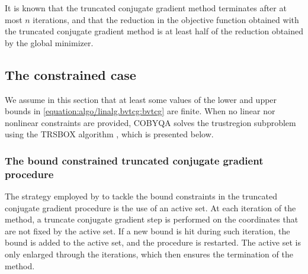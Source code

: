 \documentclass[letterpaper,10pt,english]{sphinxmanual}
\begin{document}
\sphinxAtStartPar
It is known that the truncated conjugate gradient method terminates after at
most \(n\) iterations, and that the reduction in the objective function
obtained with the truncated conjugate gradient method is at least half of the
reduction obtained by the global minimizer.


\subsection{The constrained case}
\label{\detokenize{algo/linalg.bvtcg:the-constrained-case}}
\sphinxAtStartPar
We assume in this section that at least some values of the lower and upper
bounds in \eqref{equation:algo/linalg.bvtcg:bvtcg} are finite. When no linear nor nonlinear constraints are
provided, COBYQA solves the trust\sphinxhyphen{}region subproblem using the TRSBOX algorithm
, which is presented below.


\subsubsection{The bound constrained truncated conjugate gradient procedure}
\label{\detokenize{algo/linalg.bvtcg:the-bound-constrained-truncated-conjugate-gradient-procedure}}
\sphinxAtStartPar
The strategy employed by  to tackle the bound constraints in the
truncated conjugate gradient procedure is the use of an active set. At each
iteration of the method, a truncate conjugate gradient step is performed on the
coordinates that are not fixed by the active set. If a new bound is hit during
such iteration, the bound is added to the active set, and the procedure is
restarted. The active set is only enlarged through the iterations, which then
ensures the termination of the method.
\end{document}

